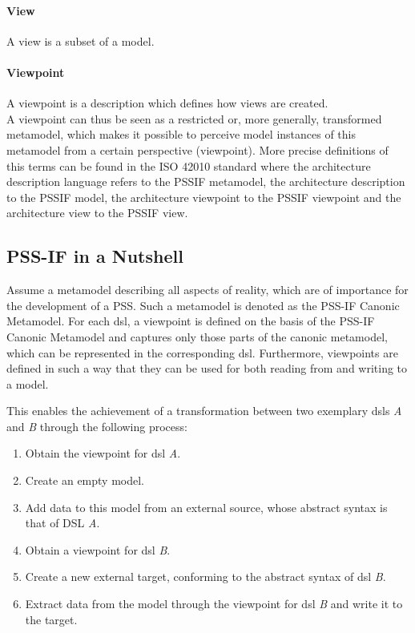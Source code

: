 \paragraph{View} A view is a subset of a model.

\paragraph{Viewpoint} A viewpoint is a description which defines how views are created.\\

A viewpoint can thus be seen as a restricted or, more generally, transformed metamodel, which makes it possible to perceive model instances of this metamodel from a certain perspective (viewpoint). More precise definitions of this terms can be found in the ISO 42010 \cite{ref:42010} standard where the architecture description language refers to the \gls{PSSIF} metamodel, the architecture description to the \gls{PSSIF} model, the architecture viewpoint to the \gls{PSSIF} viewpoint and the architecture view to the \gls{PSSIF} view.

\subsection{PSS-IF in a Nutshell}
\label{sec:approach:pssif:nutshell}

Assume a metamodel describing all aspects of reality, which are of importance for the development of a \gls{PSS}. Such a metamodel is denoted as the PSS-IF Canonic Metamodel. For each \gls{dsl}, a viewpoint is defined on the basis of the PSS-IF Canonic Metamodel and captures only those parts of the canonic metamodel, which can be represented in the corresponding \gls{dsl}. Furthermore, viewpoints are defined in such a way that they can be used for both reading from and writing to a model.

This enables the achievement of a transformation between two exemplary \glspl{dsl} \textit{A} and \textit{B} through the following process:

\begin{enumerate}
\item Obtain the viewpoint for \gls{dsl} \textit{A}.
\item Create an empty model.
\item Add data to this model from an external source, whose abstract syntax is that of DSL \textit{A}.
\item Obtain a viewpoint for \gls{dsl} \textit{B}.
\item Create a new external target, conforming to the abstract syntax of \gls{dsl} \textit{B}.
\item Extract data from the model through the viewpoint for \gls{dsl} \textit{B} and write it to the target.
\end{enumerate}

